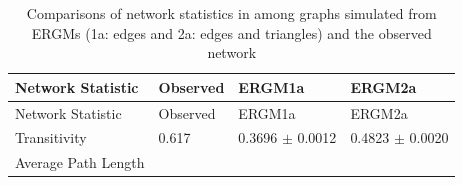 \documentclass[12pt,twoside]{amherstthesis}
\begin{document}
  \begin{longtable}[]{@{}llll@{}}
  \caption{Comparisons of network statistics in among graphs simulated
  from ERGMs (1a: edges and 2a: edges and triangles) and the observed
  network \label{tab:ergm1a2a}}\tabularnewline
  \toprule
  \begin{minipage}[b]{0.28\columnwidth}\raggedright\strut
  Network Statistic\strut
  \end{minipage} & \begin{minipage}[b]{0.11\columnwidth}\raggedright\strut
  Observed\strut
  \end{minipage} & \begin{minipage}[b]{0.24\columnwidth}\raggedright\strut
  ERGM1a\strut
  \end{minipage} & \begin{minipage}[b]{0.26\columnwidth}\raggedright\strut
  ERGM2a\strut
  \end{minipage}\tabularnewline
  \midrule
  \endfirsthead
  \toprule
  \begin{minipage}[b]{0.28\columnwidth}\raggedright\strut
  Network Statistic\strut
  \end{minipage} & \begin{minipage}[b]{0.11\columnwidth}\raggedright\strut
  Observed\strut
  \end{minipage} & \begin{minipage}[b]{0.24\columnwidth}\raggedright\strut
  ERGM1a\strut
  \end{minipage} & \begin{minipage}[b]{0.26\columnwidth}\raggedright\strut
  ERGM2a\strut
  \end{minipage}\tabularnewline
  \midrule
  \endhead
  \begin{minipage}[t]{0.28\columnwidth}\raggedright\strut
  Transitivity\strut
  \end{minipage} & \begin{minipage}[t]{0.11\columnwidth}\raggedright\strut
  0.617\strut
  \end{minipage} & \begin{minipage}[t]{0.24\columnwidth}\raggedright\strut
  0.3696 \(\pm\) 0.0012\strut
  \end{minipage} & \begin{minipage}[t]{0.26\columnwidth}\raggedright\strut
  0.4823 \(\pm\) 0.0020\strut
  \end{minipage}\tabularnewline
  \begin{minipage}[t]{0.28\columnwidth}\raggedright\strut
  Average Path Length\strut

\end{minipage}
\end{longtable}
\end{document}
